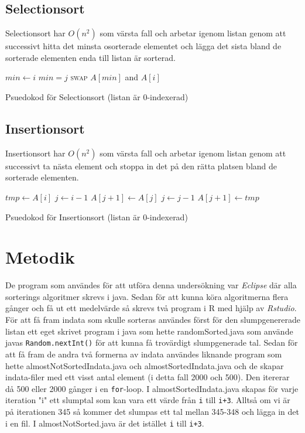 \documentclass[a4paper]{article}
\begin{document}
\subsection{Selectionsort}
Selectionsort har $O(n^2)$ som värsta fall och arbetar igenom listan genom att successivt hitta det minsta osorterade elementet och lägga det sista bland de sorterade elementen enda till listan är sorterad.\cite{Selection}
\begin{algorithm}
\begin{algorithmic}
	\State $min \gets i$
			\State $min = j$
		\EndIf
	\EndFor
		\State \textsc{swap} $A[min]$ and $A[i]$
	\EndIf
\EndFor
\EndFunction
\end{algorithmic}
\caption{Psuedokod för Selectionsort (listan är 0-indexerad)}
\end{algorithm}

\pagebreak
\subsection{Insertionsort}
Insertionsort har $O(n^2)$ som värsta fall och arbetar igenom listan genom att successivt ta nästa element och stoppa in det på den rätta platsen bland de sorterade elementen.\cite{insertion}
\begin{algorithm}
\begin{algorithmic}
	\State $tmp \gets A[i]$
	\State $j \gets i-1$
		\State $A[j+1] \gets A[j]$
		\State $j \gets j - 1$
	\EndWhile
	\State $A[j+1] \gets tmp$
\EndFor
\EndFunction
\end{algorithmic}
\caption{Psuedokod för Insertionsort (listan är 0-indexerad)}
\end{algorithm}
\section{Metodik}
De program som användes för att utföra denna undersökning var \emph{Eclipse} där alla sorterings algoritmer skrevs i java. Sedan för att kunna köra algoritmerna flera gånger och få ut ett medelvärde så skrevs två program i R med hjälp av \emph{Rstudio}. För att få fram indata som skulle sorteras användes först för den slumpgenererade listan ett eget skrivet program i java som hette randomSorted.java som använde javas \texttt{Random.nextInt()} för att kunna få trovärdigt slumpgenerade tal. Sedan för att få fram de andra två formerna av indata användes liknande program som hette almostNotSortedIndata.java och almostSortedIndata.java och de skapar indata-filer med ett visst antal element (i detta fall 2000 och 500). Den itererar då 500 eller 2000 gånger i en \texttt{for}-loop. I almostSortedIndata.java skapas för varje iteration "i" ett slumptal som kan vara ett värde från \texttt{i} till \texttt{i+3}. Alltså om vi är på iterationen 345 så kommer det slumpas ett tal mellan 345-348 och lägga in det i en fil. I almostNotSorted.java är det istället \texttt{i} till \texttt{i+3}.
\end{document}
